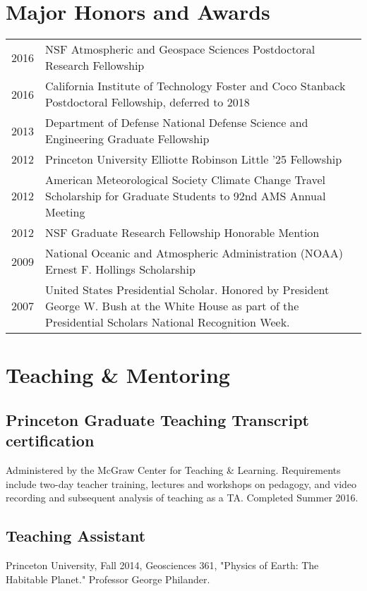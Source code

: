 \documentclass{article}
\begin{document}
\section*{Major Honors and Awards}
\label{sec:orgheadline10}
\begin{center}
\begin{tabularx}{\textwidth}{lX}
2016 & NSF Atmospheric and Geospace Sciences Postdoctoral Research Fellowship\\
2016 & California Institute of Technology Foster and Coco Stanback Postdoctoral Fellowship, deferred to 2018\\
2013 & Department of Defense National Defense Science and Engineering Graduate Fellowship\\
2012 & Princeton University Elliotte Robinson Little '25 Fellowship\\
2012 & American Meteorological Society Climate Change Travel Scholarship for Graduate Students to 92nd AMS Annual Meeting\\
2012 & NSF Graduate Research Fellowship Honorable Mention\\
2009 & National Oceanic and Atmospheric Administration (NOAA) Ernest F. Hollings Scholarship\\
2007 & United States Presidential Scholar.  Honored by President George W. Bush at the White House as part of the Presidential Scholars National Recognition Week.\\
\end{tabularx}
\end{center}
\section*{Teaching \& Mentoring}
\label{sec:orgheadline14}
\subsection*{Princeton Graduate Teaching Transcript certification}
\label{sec:orgheadline11}
Administered by the McGraw Center for Teaching \& Learning.  Requirements include
two-day teacher training, lectures and workshops on pedagogy, and video recording
and subsequent analysis of teaching as a TA.  Completed Summer 2016.
\subsection*{Teaching Assistant}
\label{sec:orgheadline12}
Princeton University, Fall 2014, Geosciences 361, "Physics of Earth: The
Habitable Planet."  Professor George Philander.
\end{document}
